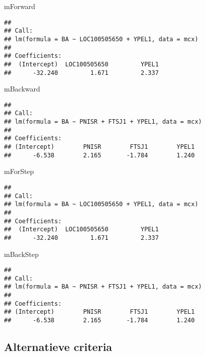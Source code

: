\documentclass[12pt,dutch,coursenotes]{book}
\newenvironment{Shaded}{\begin{snugshade}}{\end{snugshade}}
\newcommand{\NormalTok}[1]{#1}
\theoremstyle{definition}
\theoremstyle{definition}
\theoremstyle{definition}
\theoremstyle{remark}
\begin{document}
\begin{Shaded}
\begin{Highlighting}[]
\NormalTok{mForward}
\end{Highlighting}
\end{Shaded}

\begin{verbatim}
## 
## Call:
## lm(formula = BA ~ LOC100505650 + YPEL1, data = mcx)
## 
## Coefficients:
##  (Intercept)  LOC100505650         YPEL1  
##      -32.240         1.671         2.337
\end{verbatim}

\begin{Shaded}
\begin{Highlighting}[]
\NormalTok{mBackward}
\end{Highlighting}
\end{Shaded}

\begin{verbatim}
## 
## Call:
## lm(formula = BA ~ PNISR + FTSJ1 + YPEL1, data = mcx)
## 
## Coefficients:
## (Intercept)        PNISR        FTSJ1        YPEL1  
##      -6.538        2.165       -1.784        1.240
\end{verbatim}

\begin{Shaded}
\begin{Highlighting}[]
\NormalTok{mForStep}
\end{Highlighting}
\end{Shaded}

\begin{verbatim}
## 
## Call:
## lm(formula = BA ~ LOC100505650 + YPEL1, data = mcx)
## 
## Coefficients:
##  (Intercept)  LOC100505650         YPEL1  
##      -32.240         1.671         2.337
\end{verbatim}

\begin{Shaded}
\begin{Highlighting}[]
\NormalTok{mBackStep}
\end{Highlighting}
\end{Shaded}

\begin{verbatim}
## 
## Call:
## lm(formula = BA ~ PNISR + FTSJ1 + YPEL1, data = mcx)
## 
## Coefficients:
## (Intercept)        PNISR        FTSJ1        YPEL1  
##      -6.538        2.165       -1.784        1.240
\end{verbatim}

\subsection{Alternatieve criteria}\label{alternatieve-criteria}
\end{document}
